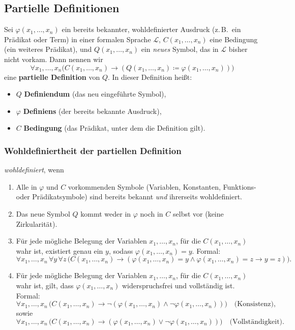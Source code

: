 \documentclass[main.tex]{subfiles}
\begin{document}
\subsection{Partielle Definitionen}
\begin{definition}
Sei \(\varphi(x_1,\dots,x_n)\) ein bereits bekannter, wohldefinierter Ausdruck (z.\,B.\ ein Prädikat oder Term) in einer formalen Sprache \(\mathcal{L}\), \(C(x_1,\dots,x_n)\) eine Bedingung (ein weiteres Prädikat), und \(Q(x_1,\dots,x_n)\) ein \emph{neues} Symbol, das in \(\mathcal{L}\) bisher nicht vorkam. Dann nennen wir
\[
\forall x_1,\dots,x_n \bigl( C(x_1,\dots,x_n) \rightarrow ( Q(x_1,\dots,x_n) \coloneqq \varphi(x_1,\dots,x_n) ) \bigr)
\]
eine \textbf{partielle Definition} von \(Q\). In dieser Definition heißt:
\begin{itemize}
    \item \(Q\) \textbf{Definiendum} (das neu eingeführte Symbol),
    \item \(\varphi\) \textbf{Definiens} (der bereits bekannte Ausdruck),
    \item \(C\) \textbf{Bedingung} (das Prädikat, unter dem die Definition gilt).
\end{itemize}

\noindent
\subsubsection{Wohldefiniertheit der partiellen Definition} \emph{wohldefiniert}, wenn
\begin{enumerate}
    \item Alle in \(\varphi\) und \(C\) vorkommenden Symbole (Variablen, Konstanten, Funktions- oder Prädikatsymbole) sind bereits bekannt \emph{und} ihrerseits wohldefiniert.
    \item Das neue Symbol \(Q\) kommt weder in \(\varphi\) noch in \(C\) selbst vor (keine Zirkularität).
    \item Für jede mögliche Belegung der Variablen \(x_1,\dots,x_n\), für die \(C(x_1,\dots,x_n)\) wahr ist, existiert genau ein \(y\), sodass \(\varphi(x_1,\dots,x_n) = y\). Formal:
    \[
    \forall x_1,\dots,x_n \, \forall y \, \forall z \, \bigl( C(x_1,\dots,x_n) \rightarrow ( \varphi(x_1,\dots,x_n) = y \land \varphi(x_1,\dots,x_n) = z \rightarrow y = z ) \bigr).
    \]
    \item Für jede mögliche Belegung der Variablen \(x_1, \dots, x_n\), für die \(C(x_1,\dots,x_n)\) wahr ist, gilt, dass \(\varphi(x_1,\dots,x_n)\) widerspruchsfrei und vollständig ist. Formal:
    \[
    \forall x_1,\dots,x_n \, \bigl( C(x_1,\dots,x_n) \rightarrow \neg ( \varphi(x_1,\dots,x_n) \land \neg \varphi(x_1,\dots,x_n) ) \bigr) \quad \text{(Konsistenz)},
    \]
    sowie
    \[
    \forall x_1,\dots,x_n \, \bigl( C(x_1,\dots,x_n) \rightarrow ( \varphi(x_1,\dots,x_n) \lor \neg \varphi(x_1,\dots,x_n) ) \bigr) \quad \text{(Vollständigkeit)}.
    \]
\end{enumerate}
\end{definition}
\end{document}
